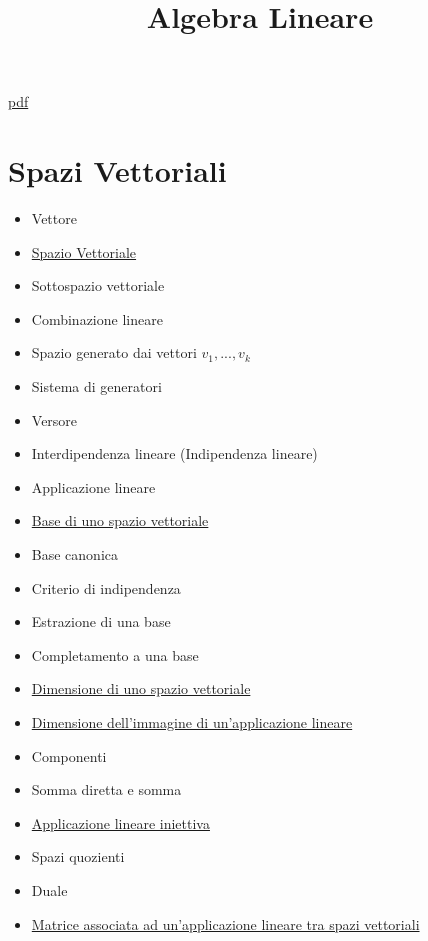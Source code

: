 \documentclass[a4paper,10pt]{article}
\title{Algebra Lineare}
\begin{document}
\maketitle
\href{AlgebraLineare.pdf}{pdf} 

\section{Spazi Vettoriali}
\begin{itemize}
 \item Vettore
 \item \href{SpazioVettoriale.html}{Spazio Vettoriale}
 \item Sottospazio vettoriale
 \item Combinazione lineare
 \item Spazio generato dai vettori $v_1, ..., v_k$
 \item Sistema di generatori
 \item Versore
 \item Interdipendenza lineare (Indipendenza lineare)
 \item Applicazione lineare
 \item \href{Base.html}{Base di uno spazio vettoriale}
 \item Base canonica
 \item Criterio di indipendenza
 \item Estrazione di una base
 \item Completamento a una base
 \item \href{Dimensione.html}{Dimensione di uno spazio vettoriale}
 \item \href{DimensioneImmagine.html}{Dimensione dell'immagine di un'applicazione lineare}
 \item Componenti
 \item Somma diretta e somma 
 \item \href{ApplicazioneIniettiva.html}{Applicazione lineare iniettiva} 
 \item Spazi quozienti
 \item Duale
 \item \href{MatriceApplicazione.html}{Matrice associata ad un'applicazione lineare tra spazi vettoriali}
\end{itemize}
\end{document}
